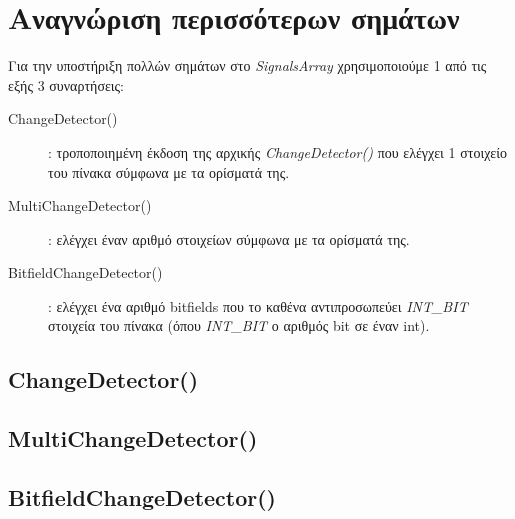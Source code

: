 \chapter{Αναγνώριση περισσότερων σημάτων}

Για την υποστήριξη πολλών σημάτων στο \textit{SignalsArray} χρησιμοποιούμε 1 από 
τις εξής 3 συναρτήσεις:
\begin{description}
	\item[ChangeDetector()]: τροποποιημένη έκδοση της αρχικής 
	\textit{ChangeDetector()} που ελέγχει 1 στοιχείο του πίνακα σύμφωνα με τα 
	ορίσματά της.
	\item[MultiChangeDetector()]: ελέγχει έναν αριθμό στοιχείων σύμφωνα με τα 
	ορίσματά της.
	\item[BitfieldChangeDetector()]: ελέγχει ένα αριθμό bitfields που το καθένα 
	αντιπροσωπεύει \textit{INT\_BIT} στοιχεία του πίνακα (όπου \textit{INT\_BIT} 
	ο 
	αριθμός bit σε έναν int).
\end{description}

\section{ChangeDetector()}
\section{MultiChangeDetector()}
\section{BitfieldChangeDetector()}
